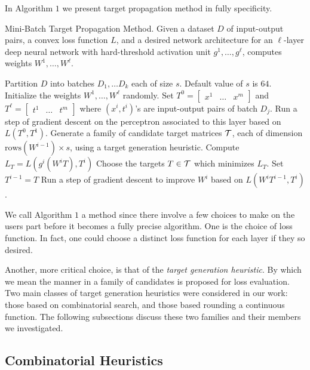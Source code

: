 In Algorithm $1$ we present target propagation method in fully specificity.

\begin{algorithm}
\caption{Mini-Batch Target Propagation Method. Given a dataset $D$ of input-output pairs, a convex loss function $L$, and a desired network architecture for an $\ell$-layer deep neural network with hard-threshold activation unit $g^1,\dots, g^\ell$, computes weights $W^1, \dots, W^\ell$.}
\begin{algorithmic}
\STATE Partition $D$ into batches $D_1, \dots D_k$ each of size $s$. Default value of $s$ is $64$. 
\STATE Initialize the weights $W^1, \dots, W^\ell$ randomly.
\STATE  Set $T^0 = \begin{bmatrix} x^1 & \dots & x^m \end{bmatrix}$ and $T^\ell = \begin{bmatrix} t^1 & \dots & t^m \end{bmatrix}$
where $(x^i,t^i)$'s are input-output pairs of batch $D_j$.
\STATE Run a step of gradient descent on the perceptron associated to this layer based on $L(T^0, T^1)$.
\ENDIF
\STATE Generate a family of candidate target matrices $\mathcal{T}$, each of dimension $\text{rows}(W^{i-1})\times s$, using a target generation heuristic.
\STATE Compute $L_T = L(g^i(W^iT), T^i)$
\ENDFOR
\STATE Choose the targets $T\in \mathcal{T}$ which minimizes $L_T$. Set $T^{i-1} = T$
\STATE Run a step of gradient descent to improve $W^i$ based on $L(W^iT^{i-1}, T^i)$.
\ENDFOR
\ENDFOR
\end{algorithmic}
\end{algorithm} 

We call Algorithm $1$ a method since there involve a few choices to make on the users part before it becomes a fully precise algorithm. One is the choice of loss function. In fact, one could choose a distinct loss function for each layer if they so desired.

Another, more critical choice, is that of the \emph{target generation heuristic}. By which we mean the manner in a family of candidates is proposed for loss evaluation. Two main classes of target generation heuristics were considered in our work: those based on combinatorial search, and those based rounding a continuous function. The following subsections discuss these two families and their members we investigated.

\subsection{Combinatorial Heuristics}
